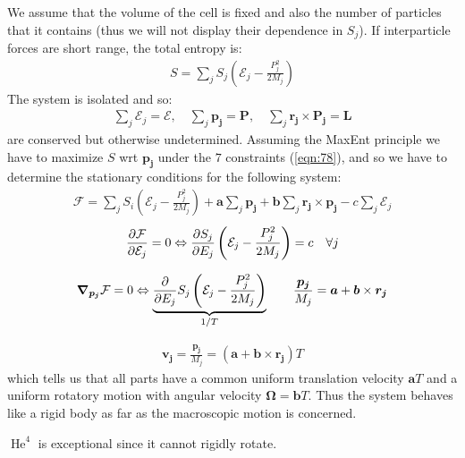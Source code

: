 \documentclass[../template.tex]{subfiles}
\begin{document}
We assume that the volume of the cell is fixed and also the number of particles that it contains (thus we will not display their dependence in $S_j$). If interparticle forces are short range, the total entropy is:
\begin{align}\label{eqn:77}
    S = \sum_j S_j\left(\mathcal{E}_j - \frac{P_j^2}{2 M_j} \right)
\end{align}
The system is isolated and so:
\begin{align}\label{eqn:78}
    \sum_j \mathcal{E}_j = \mathcal{E}, \quad \sum_j \bm{p_j} = \bm{P}, \quad \sum_j \bm{r_j} \times \bm{P_j} = \bm{L}
\end{align}
are conserved but otherwise undetermined. Assuming the MaxEnt principle we have to maximize $S$ wrt $\bm{p_j}$ under the $7$ constraints (\ref{eqn:78}), and so we have to determine the stationary conditions for the following system:
\begin{align*}
    \mathcal{F} = \sum_j S_i \left(\mathcal{E}_j - \frac{P_j^2}{2 M_j} \right) + \bm{a} \sum_j \bm{p_j} + \bm{b} \sum_j \bm{r_j} \times \bm{p_j} - c \sum_j \mathcal{E}_j
\end{align*}
\begin{align}\label{eqn:79}
    \pdv{\mathcal{F}}{\mathcal{E}_j} = 0 \Leftrightarrow \pdv{S_j}{E_j} \left(\mathcal{E}_j - \frac{P_j^2}{2M_j} \right) = c \quad \forall j
\end{align}

\begin{align}\label{eqn:80}
    \grad_{\bm{p_j}} \mathcal{F} = 0 \Leftrightarrow \underbrace{\pdv{E_j} S_j \left(\mathcal{E}_j - \frac{P_j^2}{2 M_j} \right)}_{1/T} \qquad \frac{\bm{p_j}}{M_j} = \bm{a} + \bm{b} \times \bm{r_j}
\end{align}

\begin{align}\label{eqn:81}
    \bm{v_j} = \frac{\bm{p_j}}{M_j} = (\bm{a} + \bm{b} \times \bm{r_j}) T
\end{align}
which tells us that all parts have a common uniform translation velocity $\bm{a}T$ and a uniform rotatory motion with angular velocity $\bm{\Omega} = \bm{b}T$. Thus the system behaves like a rigid body as far as the macroscopic motion is concerned.

\medskip

$\operatorname{He}^4$ is exceptional since it cannot rigidly rotate.
\end{document}
